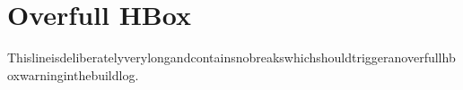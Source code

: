 \documentclass{article}
\begin{document}
\section{Overfull HBox}
Thislineisdeliberatelyverylongandcontainsnobreakswhichshouldtriggeranoverfullhboxwarninginthebuildlog.
\end{document}
